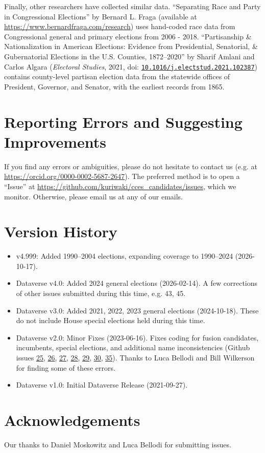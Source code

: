 \documentclass[12pt]{article}
\begin{document}


Finally, other researchers have collected similar data. ``Separating Race and Party in Congressional
Elections'' by Bernard L. Fraga (available at \url{https://www.bernardfraga.com/research}) uses hand-coded race data from Congressional general and primary elections from 2006 - 2018. ``Partisanship \& Nationalization in American Elections: Evidence from Presidential, Senatorial, \& Gubernatorial Elections in the U.S. Counties, 1872--2020'' by Sharif Amlani and Carlos Algara (\emph{Electoral Studies}, 2021, doi: \href{https://doi.org/10.1016/j.electstud.2021.102387}{\texttt{10.1016/j.electstud.2021.102387}}) contains county-level partisan election data from the statewide offices of President, Governor, and Senator, with the earliest records from 1865.

\section{Reporting Errors and Suggesting Improvements}

If you find any errors or ambiguities, please do not hesitate to contact us (e.g. at \url{https://orcid.org/0000-0002-5687-2647}). The preferred method is to open a ``Issue'' at \url{https://github.com/kuriwaki/cces_candidates/issues}, which we monitor. Otherwise, please email us at any of our emails.



\section{Version History}

\begin{itemize}
\item v4.999: Added 1990--2004 elections, expanding coverage to 1990--2024 (2026-10-17).
\item Dataverse v4.0: Added 2024 general elections (2026-02-14). A few corrections of other issues submitted during this time, e.g. 43, 45.
\item Dataverse v3.0: Added 2021, 2022, 2023 general elections (2024-10-18). These do not include House special elections held during this time.
\item Dataverse v2.0: Minor Fixes (2023-06-16). Fixes coding for fusion candidates, incumbents, special elections, and additional name inconsistencies (Github issues \href{https://github.com/kuriwaki/cces_candidates/issues/25}{25}, \href{https://github.com/kuriwaki/cces_candidates/issues/26}{26}, \href{https://github.com/kuriwaki/cces_candidates/issues/27}{27}, \href{https://github.com/kuriwaki/cces_candidates/issues/28}{28}, \href{https://github.com/kuriwaki/cces_candidates/issues/29}{29}, \href{https://github.com/kuriwaki/cces_candidates/issues/30}{30},
\href{https://github.com/kuriwaki/cces_candidates/issues/35}{35}). Thanks to Luca Bellodi and Bill Wilkerson for finding some of these errors.
\item Dataverse v1.0: Initial Dataverse Release (2021-09-27).
\end{itemize}

\section{Acknowledgements}
Our thanks to Daniel Moskowitz and Luca Bellodi for submitting issues.
\end{document}
